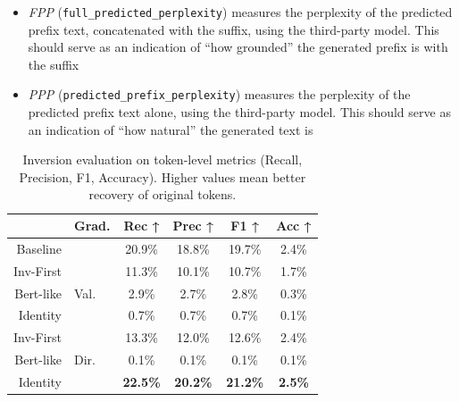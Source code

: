 \documentclass[../thesis.tex]{subfiles}
\begin{document}
\begin{itemize}
    \item \emph{FPP} (\texttt{full\_predicted\_perplexity}) measures the perplexity of the predicted prefix text, concatenated with the suffix, using the third-party model. This should serve as an indication of ``how grounded'' the generated prefix is with the suffix
    \item \emph{PPP} (\texttt{predicted\_prefix\_perplexity}) measures the perplexity of the predicted prefix text alone, using the third-party model. This should serve as an indication of ``how natural'' the generated text is
\end{itemize}



\begin{table}[bthp]
\centering
\begin{tabular}{rlcccc}
\toprule
           & \textbf{Grad.} & \textbf{Rec ↑}  & \textbf{Prec ↑} & \textbf{F1 ↑}   & \textbf{Acc ↑}  \\
\midrule
Baseline   &                & 20.9\%          & 18.8\%          & 19.7\%          & 2.4\%          \\
\midrule
Inv-First  &                & 11.3\%          & 10.1\%          & 10.7\%          & 1.7\%          \\
Bert-like  & Val.           & 2.9\%           & 2.7\%           & 2.8\%           & 0.3\%          \\
Identity   &                & 0.7\%           & 0.7\%           & 0.7\%           & 0.1\%          \\
\midrule
Inv-First  &                & 13.3\%          & 12.0\%          & 12.6\%          & 2.4\%          \\
Bert-like  & Dir.           & 0.1\%           & 0.1\%           & 0.1\%           & 0.1\%          \\
Identity   &                & \textbf{22.5\%} & \textbf{20.2\%} & \textbf{21.2\%} & \textbf{2.5\%} \\
\bottomrule
\end{tabular}
\vspace{0.25cm}
\caption{Inversion evaluation on token-level metrics (Recall, Precision, F1, Accuracy). Higher values mean better recovery of original tokens.}
\label{tab:ilm-evaluation-token-metrics}
\end{table}


\end{document}
